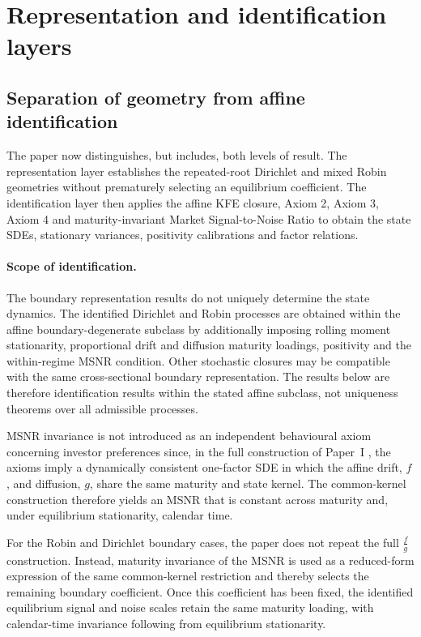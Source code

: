 \documentclass[12pt]{article}
\numberwithin{equation}{subsection}
\begin{document}
\section{Representation and identification layers}

\subsection{Separation of geometry from affine identification}

The paper now distinguishes, but includes, both levels of result. The representation layer establishes the repeated-root Dirichlet and mixed Robin geometries without prematurely selecting an equilibrium coefficient. The identification layer then applies the affine KFE closure, Axiom 2, Axiom 3, Axiom 4 and maturity-invariant Market Signal-to-Noise Ratio to obtain the state SDEs, stationary variances, positivity calibrations and factor relations.

\paragraph{Scope of identification.}
The boundary representation results do not uniquely determine the state dynamics. The identified Dirichlet and Robin processes are obtained within the affine boundary-degenerate subclass by additionally imposing rolling moment stationarity, proportional drift and diffusion maturity loadings, positivity and the within-regime MSNR condition. Other stochastic closures may be compatible with the same cross-sectional boundary representation. The results below are therefore identification results within the stated affine subclass, not uniqueness theorems over all admissible processes.

MSNR invariance is not introduced as an independent behavioural axiom concerning investor preferences since, in the full construction of Paper~I \cite{Oza2026}, the axioms imply a dynamically consistent one-factor SDE in which the affine drift, $f$, and diffusion, $g$, share the same maturity and state kernel. The common-kernel construction therefore yields an MSNR that is constant across maturity and, under equilibrium stationarity, calendar time.

For the Robin and Dirichlet boundary cases, the paper does not repeat the full $\frac{f}{g}$ construction. Instead, maturity invariance of the MSNR is used as a reduced-form expression of the same common-kernel restriction and thereby selects the remaining boundary coefficient. Once this coefficient has been fixed, the identified equilibrium signal and noise scales retain the same maturity loading, with calendar-time invariance following from equilibrium stationarity.
\end{document}
